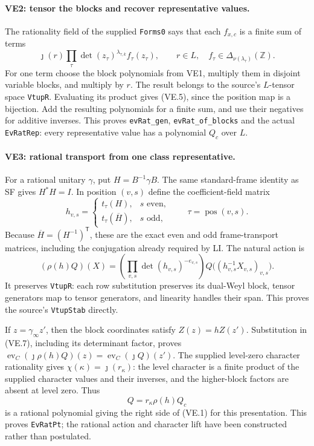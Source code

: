 \paragraph{VE2: tensor the blocks and recover representative values.}
The rationality field of the supplied \texttt{Forms0} says that each
$f_{x,c}$ is a finite sum of terms
\[
 \jmath(r)\prod_\tau\det(z_\tau)^{\lambda_{\tau,k}}
                                  f_\tau(z_\tau),
 \qquad r\in L,\quad f_\tau\in\Delta_{\nu(\lambda_\tau)}(\mathbb Z).
                                                        \tag{VE.5}
\]
For one term choose the block polynomials from VE1, multiply them
in disjoint variable blocks, and multiply by $r$. The result belongs
to the source's $L$-tensor space \texttt{VtupR}. Evaluating its product
gives (VE.5), since the position map is a bijection. Add the resulting
polynomials for a finite sum, and use their negatives for additive
inverses. This proves \texttt{evRat\_gen}, \texttt{evRat\_of\_blocks}
and the actual \texttt{EvRatRep}: every representative value has a
polynomial $Q_c$ over $L$.

\paragraph{VE3: rational transport from one class representative.}
For a rational unitary $\gamma$, put $H=B^{-1}\gamma B$.
The same standard-frame identity as SF gives $H^*H=I$. In position
$(v,s)$ define the coefficient-field matrix
\[
 h_{v,s}=
 \begin{cases}
 t_\tau(H),&s\text{ even},\\
 t_\tau(\overline H),&s\text{ odd},
 \end{cases}
 \qquad\tau=\operatorname{pos}(v,s).
                                                        \tag{VE.6}
\]
Because $\overline H=(H^{-1})^{\mathsf T}$, these are the exact
even and odd frame-transport matrices, including the conjugation
already required by LI. The natural action is
\[
 (\rho(h)Q)(X)=
    \left(\prod_{v,s}\det(h_{v,s})^{-e_{v,s}}\right)
             Q\bigl((h_{v,s}^{-1}X_{v,s})_{v,s}\bigr).
                                                        \tag{VE.7}
\]
It preserves \texttt{VtupR}: each row substitution preserves its
dual-Weyl block, tensor generators map to tensor generators, and
linearity handles their span. This proves the source's
\texttt{VtupStab} directly.

If $z=\gamma_\infty z'$, then the block coordinates satisfy
$Z(z)=hZ(z')$. Substitution in (VE.7), including its determinant
factor, proves
$\operatorname{ev}_C(\jmath\rho(h)Q)(z)
=\operatorname{ev}_C(\jmath Q)(z')$.
The supplied level-zero character rationality gives
$\chi(\kappa)=\jmath(r_\kappa)$: the level character is a finite
product of the supplied character values and their inverses, and
the higher-block factors are absent at level zero. Thus
\[
 Q=r_\kappa\rho(h)Q_c
                                                        \tag{VE.8}
\]
is a rational polynomial giving the right side of (VE.1) for this
presentation. This proves \texttt{EvRatPt}; the rational action and
character lift have been constructed rather than postulated.

